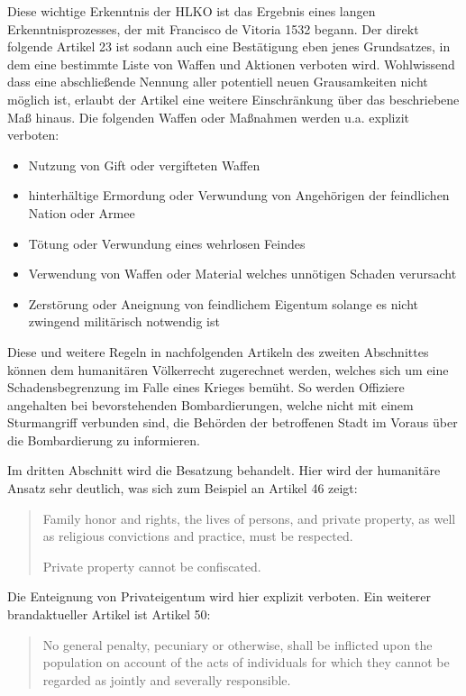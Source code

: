 \documentclass[12pt]{scrartcl}
\begin{document}
Diese wichtige Erkenntnis der HLKO ist das Ergebnis eines langen Erkenntnisprozesses, der mit Francisco de Vitoria 1532 begann. Der direkt folgende Artikel 23 ist sodann auch eine Bestätigung eben jenes Grundsatzes, in dem eine bestimmte Liste von Waffen und Aktionen verboten wird. Wohlwissend dass eine abschließende Nennung aller potentiell neuen Grausamkeiten nicht möglich ist, erlaubt der Artikel eine weitere Einschränkung über das beschriebene Maß hinaus.\cite{Scott-V1-1921} Die folgenden Waffen oder Maßnahmen werden u.a. explizit verboten:

\begin{itemize}
	\item Nutzung von Gift oder vergifteten Waffen
	\item hinterhältige Ermordung oder Verwundung von Angehörigen der feindlichen Nation oder Armee
	\item Tötung oder Verwundung eines wehrlosen Feindes
	\item Verwendung von Waffen oder Material welches unnötigen Schaden verursacht
	\item Zerstörung oder Aneignung von feindlichem Eigentum solange es nicht zwingend militärisch notwendig ist
\end{itemize}

Diese und weitere Regeln in nachfolgenden Artikeln des zweiten Abschnittes können dem humanitären Völkerrecht zugerechnet werden, welches sich um eine Schadensbegrenzung im Falle eines Krieges bemüht. So werden Offiziere angehalten bei bevorstehenden Bombardierungen, welche nicht mit einem Sturmangriff verbunden sind, die Behörden der betroffenen Stadt im Voraus über die Bombardierung zu informieren.\cite{Scott-V1-1921}

Im dritten Abschnitt wird die Besatzung behandelt. Hier wird der humanitäre Ansatz sehr deutlich, was sich zum Beispiel an Artikel 46 zeigt\cite{Scott-V1-1921}:

\begin{quotation}
	Family honor and rights, the lives of persons, and private property, as well as religious convictions and practice, must be respected.

Private property cannot be confiscated.
\end{quotation}

Die Enteignung von Privateigentum wird hier explizit verboten. Ein weiterer brandaktueller Artikel ist Artikel 50:

\begin{quotation}
	No general penalty, pecuniary or otherwise, shall be inflicted upon the population on account of the acts of individuals for which they cannot be regarded
as jointly and severally responsible.
\end{quotation}
\end{document}
